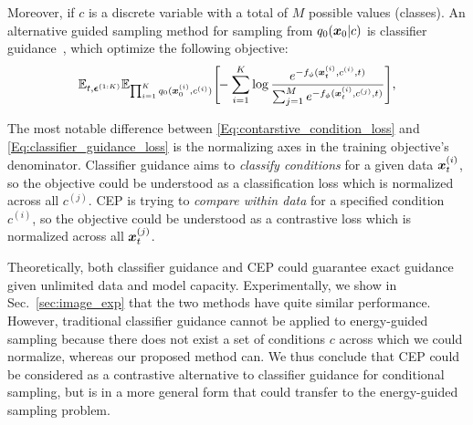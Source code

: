 Moreover, if $c$ is a discrete variable with a total of $M$ possible values (classes). An alternative guided sampling method for sampling from $q_0({\bm{x}}_0|c)$ is classifier guidance~\citep{diffusion_beat_gan}, which optimize the following objective:
\begin{equation}
\label{Eq:classifier_guidance_loss}
    \mathbb{E}_{t,\bm{\epsilon}^{(1:K)}}\mathbb{E}_{\prod_{i=1}^K q_0({\bm{x}}_0^{(i)},c^{(i)})}\Bigg[\!\!
    -\sum_{i=1}^K \log \frac{e^{-f_\phi({\bm{x}}_t^{(i)},c^{(i)},t)}}{\sum_{j=1}^M e^{-f_\phi({\bm{x}}_t^{(i)},c^{(j)},t)}}
\Bigg],
\end{equation}




The most notable difference between \eqref{Eq:contarstive_condition_loss} and \eqref{Eq:classifier_guidance_loss} is the normalizing axes in the training objective's denominator. Classifier guidance aims to \textit{classify conditions} for a given data ${\bm{x}}_t^{(i)}$, so the objective could be understood as a classification loss which is normalized across all $c^{(j)}$. CEP is trying to \textit{compare within data} for a specified condition $c^{(i)}$, so the objective could be understood as a contrastive loss which is normalized across all ${\bm{x}}_t^{(j)}$.

Theoretically, both classifier guidance and CEP could guarantee exact guidance given unlimited data and model capacity. Experimentally, we show in Sec.~\ref{sec:image_exp} that the two methods have quite similar performance.
However, traditional classifier guidance cannot be applied to energy-guided sampling because there does not exist a set of conditions $c$ across which we could normalize, whereas our proposed method can.
We thus conclude that CEP could be considered as a contrastive alternative to classifier guidance for conditional sampling, but is in a more general form that could transfer to the energy-guided sampling problem.


















